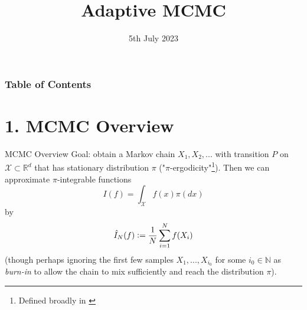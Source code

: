 \documentclass[aspectratio=169]{beamer}
\title[Short Title]{Adaptive MCMC}
\author{}%
\date{5th July 2023}
\let\oldfootnote\footnote
\renewcommand{\footnote}{\only<+->\oldfootnote}
\begin{document}



\begin{frame}%
  \titlepage
  
\end{frame}


\begin{frame}
\frametitle{Table of Contents}
\tableofcontents
\end{frame}

\section{1. MCMC Overview}
\begin{frame}{MCMC Overview}
    Goal: obtain a Markov chain $X_1, X_2, ...$ with transition $P$ on $\mathcal{X} \subset \mathbb{R}^{d}$ that has stationary distribution $\pi$ ("$\pi$-ergodicity"\footnote{Defined broadly in \cite{andrieu_tutorial_2008}}).
    \onslide<+->
    Then we can approximate $\pi$-integrable functions
    $$I(f) = \int_\mathcal{X} f(x) \pi(dx)$$
    by
    $$\hat{I}_N(f) \vcentcolon = \frac{1}{N} \sum_{i=1}^N f(X_i)$$
    \onslide<+->
    (though perhaps ignoring the first few samples $X_1, ..., X_{i_0}$ for some $i_0 \in \mathbb{N}$ as \textit{burn-in} to allow the chain to mix sufficiently and reach the distribution $\pi$).
\end{frame}
\end{document}
